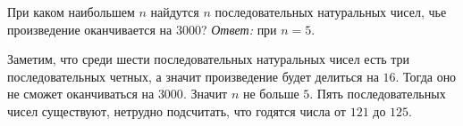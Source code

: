 \problem
При каком наибольшем $n$ найдутся $n$ последовательных натуральных чисел, чье
произведение оканчивается на $3000$?
\solution
\emph{Ответ:} при $n = 5$.
\par
Заметим, что среди шести последовательных натуральных чисел есть три
последовательных четных, а значит произведение будет делиться на $16$.
Тогда оно не сможет оканчиваться на $3000$.
Значит $n$ не больше $5$.
Пять последовательных чисел существуют, нетрудно подсчитать, что годятся числа
от $121$ до $125$.
\endproblem
